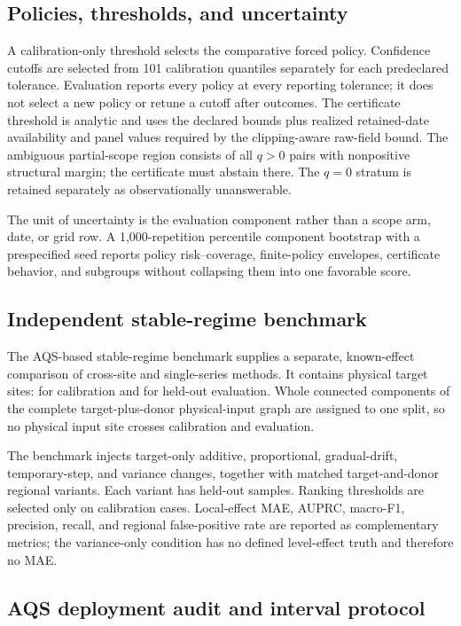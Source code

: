 \subsection{Policies, thresholds, and uncertainty}

A calibration-only threshold selects the comparative forced policy. Confidence
cutoffs are selected from 101 calibration quantiles separately for each
predeclared tolerance. Evaluation reports every policy at every reporting
tolerance; it does not select a new policy or retune a cutoff after outcomes.
The certificate threshold is analytic and uses the declared bounds plus
realized retained-date availability and panel values required by the
clipping-aware raw-field bound. The ambiguous partial-scope region consists of
all $q>0$ pairs with nonpositive structural margin; the certificate must
abstain there. The $q=0$ stratum is retained separately as observationally
unanswerable.

The unit of uncertainty is the evaluation component rather than a scope arm,
date, or grid row. A 1,000-repetition percentile component bootstrap with a
prespecified seed reports policy risk--coverage, finite-policy envelopes,
certificate behavior, and subgroups without collapsing them into one favorable
score.

\subsection{Independent stable-regime benchmark}

The AQS-based stable-regime benchmark supplies a separate, known-effect
comparison of cross-site and single-series methods. It contains
\SyntheticCases{} physical target sites: \CalibrationCases{} for calibration
and \EvaluationCases{} for held-out evaluation. Whole connected components of
the complete target-plus-donor physical-input graph are assigned to one split,
so no physical input site crosses calibration and evaluation.

The benchmark injects target-only additive, proportional, gradual-drift,
temporary-step, and variance changes, together with matched target-and-donor
regional variants. Each variant has \SamplesPerVariant{} held-out samples.
Ranking thresholds are selected only on calibration cases. Local-effect MAE,
AUPRC, macro-F1, precision, recall, and regional false-positive rate are
reported as complementary metrics; the variance-only condition has no
defined level-effect truth and therefore no MAE.

\subsection{AQS deployment audit and interval protocol}

